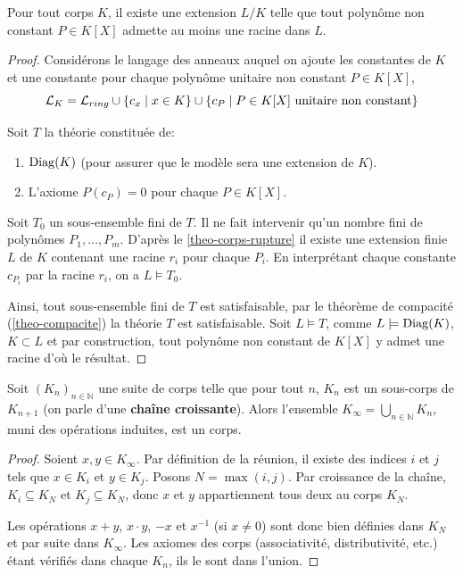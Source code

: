 \begin{lemm}\label{lemm-extension-racine}
    Pour tout corps $K$, il existe une extension $L/K$ telle que tout polynôme non constant $P \in K[X]$ admette au moins une racine dans $L$.
\end{lemm}

\begin{proof}
    Considérons le langage des anneaux auquel on ajoute les constantes de $K$ et
   une constante pour chaque polynôme unitaire non constant $P \in K[X]$, \[ \mathcal{L}_K =
   \mathcal{L}_{ring} \cup \{c_x \mid x \in K\}  \cup \{c_P \mid P\in K[X] \text{ unitaire
   non constant}\}\]

    Soit $T$ la théorie constituée de:
    \begin{enumerate}
        \item $\operatorname{Diag}(K)$ (pour assurer que le modèle sera une extension de $K$).
        \item L'axiome $P(c_P) = 0$ pour chaque $P \in K[X]$.
    \end{enumerate}
    
    Soit $T_0$ un sous-ensemble fini de $T$. Il ne fait intervenir qu'un nombre
    fini de polynômes $P_1, \ldots , P_m$. D'après le \cref{theo-corps-rupture} il
    existe une extension finie $L$ de $K$ contenant une racine $r_i$ pour chaque
    $P_i$.
    En interprétant chaque constante  $c_{P_i}$ par la racine $r_i$,  on a $L
    \models T_0$.
    
    Ainsi, tout sous-ensemble fini de $T$ est satisfaisable, par le théorème
    de compacité (\cref{theo-compacite}) la théorie $T$ est satisfaisable. Soit
    $L \models T$, comme $L \models \operatorname{Diag}(K)$, $K \subset L$ et par
    construction, tout polynôme non constant de $K[X]$ y admet une racine d'où
    le résultat.
\end{proof}

\begin{lemm}\label{lemm-chaine-corps}
    Soit $(K_n)_{n \in \mathbb{N}}$ une suite de corps telle que pour tout $n$, $K_n$ est un sous-corps de $K_{n+1}$ (on parle d'une \textbf{chaîne croissante}).
    Alors l'ensemble $K_\infty = \bigcup_{n \in \mathbb{N}} K_n$, muni des opérations induites, est un corps.
\end{lemm}

\begin{proof}
    Soient $x, y \in K_\infty$. Par définition de la réunion, il existe des indices $i$ et $j$ tels que $x \in K_i$ et $y \in K_j$. Posons $N = \max(i, j)$. Par croissance de la chaîne, $K_i \subseteq K_N$ et $K_j \subseteq K_N$, donc $x$ et $y$ appartiennent tous deux au corps $K_N$.
    
    Les opérations $x+y$, $x \cdot y$, $-x$ et $x^{-1}$ (si $x \ne 0$) sont donc bien définies dans $K_N$ et par suite dans $K_\infty$. Les axiomes des corps (associativité, distributivité, etc.) étant vérifiés dans chaque $K_n$, ils le sont dans l'union.
\end{proof}

